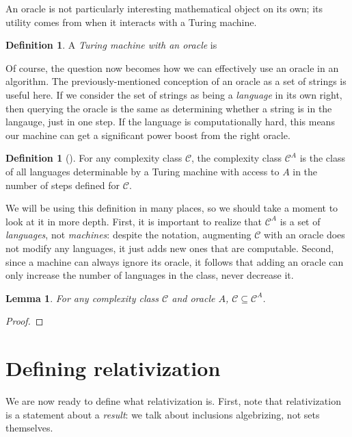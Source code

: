 \documentclass{reedthesis}
\theoremstyle{plain}
\newtheorem{lemma}[thm]{Lemma}
\theoremstyle{definition}
\newtheorem{defn}[thm]{Definition}
\theoremstyle{remark}
\numberwithin{equation}{section}
\begin{document}
An oracle is not particularly interesting mathematical object on its own; its
utility comes from when it interacts with a Turing machine.
\begin{defn}\label{def:tm-oracle}
  A \emph{Turing machine with an oracle} is %
\end{defn}

Of course, the question now becomes how we can effectively use an oracle in an
algorithm. The previously-mentioned conception of an oracle as a set of strings
is useful here. If we consider the set of strings as being a \emph{language} in
its own right, then querying the oracle is the same as determining whether a
string is in the langauge, just in one step. If the language is computationally
hard, this means our machine can get a significant power boost from the right
oracle.

\begin{defn}[{\cite[Def.\ 2.1]{AW09}}]\label{def:oracle-class}
  For any complexity class $\mathcal{C}$, the complexity class $\mathcal{C}^{A}$ is the class of all
  languages determinable by a Turing machine with access to $A$ in the number of
  steps defined for $\mathcal{C}$.
\end{defn}

We will be using this definition in many places, so we should take a moment to
look at it in more depth. First, it is important to realize that $\mathcal{C}^{A}$ is a
set of \emph{languages}, not \emph{machines}: despite the notation, augmenting
$\mathcal{C}$ with an oracle does not modify any languages, it just adds new ones that are
computable. Second, since a machine can always ignore its oracle, it follows
that adding an oracle can only increase the number of languages in the class,
never decrease it.

\begin{lemma}\label{thm:relativizing-increases}
  For any complexity class $\mathcal{C}$ and oracle $A$, $\mathcal{C} \subseteq \mathcal{C}^{A}$.
\end{lemma}

\begin{proof}
\end{proof}

\section{Defining relativization}

We are now ready to define what relativization is. First, note that
relativization is a statement about a \emph{result}: we talk about inclusions
algebrizing, not sets themselves.
\end{document}
